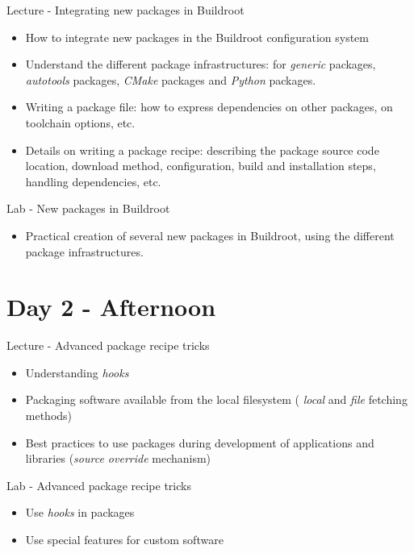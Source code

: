 \documentclass[a4paper,12pt,obeyspaces,spaces,hyphens]{article}
\begin{document}
\feagendatwocolumn
{Lecture - Integrating new packages in Buildroot}
{
  \begin{itemize}
  \item How to integrate new packages in the Buildroot configuration
    system
  \item Understand the different package infrastructures: for {\em
      generic} packages, {\em autotools} packages, {\em CMake}
    packages and {\em Python} packages.
  \item Writing a package  file: how to express
    dependencies on other packages, on toolchain options, etc.
  \item Details on writing a package recipe: describing the package
    source code location, download method, configuration, build and
    installation steps, handling dependencies, etc.
  \end{itemize}
}
{Lab - New packages in Buildroot}
{
  \begin{itemize}
  \item Practical creation of several new packages in Buildroot,
    using the different package infrastructures.
  \end{itemize}
}

\section{Day 2 - Afternoon}

\feagendatwocolumn
{Lecture - Advanced package recipe tricks}
{
  \begin{itemize}
  \item Understanding {\em hooks}
  \item Packaging software available from the local filesystem ({\em
      local} and {\em file} fetching methods)
  \item Best practices to use packages during development of
    applications and libraries ({\em source override} mechanism)
  \end{itemize}
}
{Lab - Advanced package recipe tricks}
{
  \begin{itemize}
  \item Use {\em hooks} in packages
  \item Use special features for custom software
  \end{itemize}
}
\end{document}
